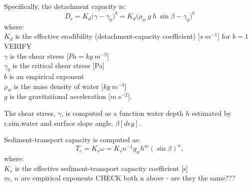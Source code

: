 \documentclass[gmd, manuscript]{copernicus}
\begin{document}
Specifically,  the detachment capacity is:
\begin{equation}
\label{eq:detach_cap}
D_c =K_d  \bigl(\gamma - \gamma_0 \bigr)^b = K_d  \bigl(\rho_w~g~h~\sin \beta - \gamma_0 \bigr)^b 
\end{equation}
{\small
\noindent
where: \\
\noindent
\hspace*{0.5em} $K_d$ is the effective erodibility (detachment-capacity coefficient) [$\unit{s~m^{-1}}$] for $b=1$ VERIFY\\
\hspace*{0.5em} $\gamma$ is the shear stress [$\unit{Pa=kg~m^{-2}}$] \\
\hspace*{0.5em} $\gamma_0$ is the critical shear stress [Pa] \\
\hspace*{0.5em} $b$ is an empirical exponent \\
\hspace*{0.5em} $\rho_w$ is the mass density of water [$\unit{kg~m^{-3}}$] \\
\hspace*{0.5em} $g$ is the gravitational acceleration [$\unit{m~s^{-2}}$].
}

The shear stress, $\gamma $, is computed as a function  water
depth $h$ estimated by r.sim.water and surface slope angle, $\beta [deg] $.

Sediment-transport capacity is computed as:
\smallskip
\begin{equation}
\label{eq:tc_streampower}
T_c =K_s \omega =
K_s n ^{-1} g_w h^{m} (\sin \beta)^{n}, 
\end{equation}
{\small
\noindent
where: \\
\noindent
\hspace*{0.5em} $K_s$ is the effective sediment-transport capacity coefficient [s] \\
\hspace*{0.5em} $m$, $n$ are empirical exponents CHECK both n above - are they the same???
}

\end{document}
